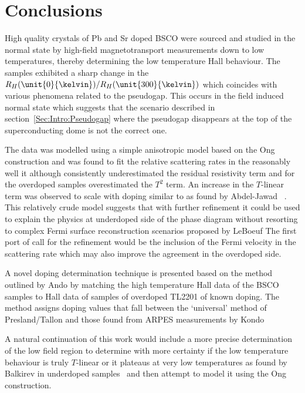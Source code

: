 
\section{Conclusions}

High quality crystals of Pb and Sr doped \ac{BSCO} were sourced and studied in the normal state by high-field magnetotransport measurements down to low temperatures, thereby determining the low temperature Hall behaviour. The samples exhibited a sharp change in the $R_H(\unit{0}{\kelvin})/R_H(\unit{300}{\kelvin})$ which coincides with various phenomena related to the pseudogap. This occurs in the field induced normal state which suggests that the scenario described in section~\ref{Sec:Intro:Pseudogap} where the pseudogap disappears at the top of the superconducting dome is not the correct one.

The data was modelled using a simple anisotropic model based on the Ong construction and was found to fit the relative scattering rates in the reasonably well it although consistently underestimated the residual resistivity term and for the overdoped samples overestimated the $T^2$ term. An increase in the $T$-linear term was observed to scale with doping similar to as found by Abdel-Jawad \etal~\cite{Abdel-Jawad2007}. This relatively crude model suggests that with further refinement it could be used to explain the physics at underdoped side of the phase diagram without resorting to complex Fermi surface reconstruction scenarios proposed by LeBoeuf \etal The first port of call for the refinement would be the inclusion of the Fermi velocity in the scattering rate which may also improve the agreement in the overdoped side.

A novel doping determination technique is presented based on the method outlined by Ando \etal{} by matching the high temperature Hall data of the \ac{BSCO} samples to Hall data of samples of overdoped \ac{TL2201} of known doping. The method assigns doping values that fall between the `universal' method of Presland/Tallon and those found from \ac{ARPES} measurements by Kondo \etal

A natural continuation of this work would include a more precise determination of the low field region to determine with more certainty if the low temperature behaviour is truly $T$-linear or it plateaus at very low temperatures as found by Balkirev \etal{} in underdoped samples~\cite{Balakirev2003} and then attempt to model it using the Ong construction.
